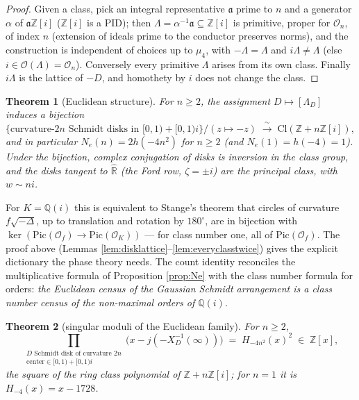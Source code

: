 \documentclass[11pt]{amsart}
\numberwithin{equation}{section}
\theoremstyle{plain}
\newtheorem{theorem}{Theorem}[section]
\theoremstyle{definition}
\theoremstyle{remark}
\newcommand{\R}{\mathbb{R}}
\newcommand{\Q}{\mathbb{Q}}
\newcommand{\Z}{\mathbb{Z}}
\newcommand{\Zi}{\Z[i]}
\newcommand{\Rhat}{\widehat{\R}}
\newcommand{\Cl}{\mathrm{Cl}}
\newcommand{\Pic}{\mathrm{Pic}}
\newcommand{\ideala}{\mathfrak{a}}
\begin{document}
\begin{proof}
Given a class, pick an integral representative $\ideala$ prime to
$n$ and a generator $\alpha$ of $\ideala\Zi$ ($\Zi$ is a PID); then
$\Lambda = \alpha^{-1}\ideala \subseteq \Zi$ is primitive, proper for
$\mathcal{O}_n$, of index $n$ (extension of ideals prime to the
conductor preserves norms), and the construction is independent of
choices up to $\mu_4$, with $-\Lambda = \Lambda$ and $i\Lambda \ne
\Lambda$ (else $i \in \mathcal{O}(\Lambda) = \mathcal{O}_n$).
Conversely every primitive $\Lambda$ arises from its own class.
Finally $i\Lambda$ is the lattice of $-D$, and homothety by $i$ does
not change the class.
\end{proof}

\begin{theorem}[Euclidean structure]\label{thm:euclidstructure}
For $n \ge 2$, the assignment $D \mapsto [\Lambda_D]$ induces a
bijection
\[
  \bigl\{\text{curvature-}2n \text{ Schmidt disks in } [0,1) +
  [0,1)i\bigr\}\big/(z \mapsto -z)
  \;\xrightarrow{\ \sim\ }\; \Cl(\Z + n\Zi),
\]
and in particular $N_e(n) = 2h(-4n^2)$ for $n \ge 2$ (and $N_e(1) =
h(-4) = 1$).  Under the bijection, complex conjugation of disks is
inversion in the class group, and the disks tangent to $\Rhat$ (the
Ford row, $\zeta = \pm i$) are the principal class, with $w \sim ni$.
\end{theorem}

For $K = \Q(i)$ this is equivalent to Stange's theorem
\cite{StangeIMRN} that circles of curvature $f\sqrt{-\Delta}$, up to
translation and rotation by $180^{\circ}$, are in bijection with
$\ker(\Pic(\mathcal{O}_f) \to \Pic(\mathcal{O}_K))$ --- for class
number one, all of $\Pic(\mathcal{O}_f)$.  The proof above (Lemmas
\ref{lem:disklattice}--\ref{lem:everyclasstwice}) gives the explicit
dictionary the phase theory needs.  The count identity reconciles the
multiplicative formula of Proposition \ref{prop:Ne} with the class
number formula for orders: \emph{the Euclidean census of the Gaussian
Schmidt arrangement is a class number census of the non-maximal orders
of $\Q(i)$}.

\begin{theorem}[singular moduli of the Euclidean family]
\label{thm:eucj}
For $n \ge 2$,
\[
  \prod_{\substack{D \text{ Schmidt disk of curvature } 2n\\
  \text{center} \in [0,1) + [0,1)i}}
  \bigl(x - j(-X_D^{-1}(\infty))\bigr)
  \;=\; H_{-4n^2}(x)^2 \;\in\; \Z[x],
\]
the square of the ring class polynomial of $\Z + n\Zi$; for $n = 1$ it
is $H_{-4}(x) = x - 1728$.
\end{theorem}
\end{document}
